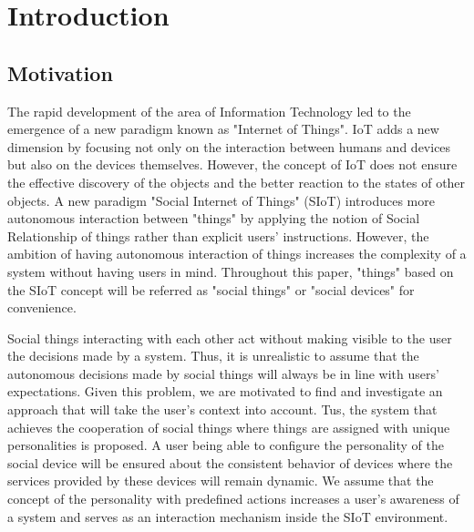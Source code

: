 \chapter{Introduction}
\label{ch:introduction}

\section{Motivation}
\label{sec:motivation}
The rapid development of the area of Information Technology led to the
emergence of a new paradigm known as "Internet of Things".
IoT adds a new dimension by focusing not only on the interaction between
humans and devices but also on the devices themselves.
However, the concept of IoT does not ensure the effective discovery of the
objects and the better reaction to the states of other objects.
A new paradigm "Social Internet of Things" (SIoT) introduces more autonomous
interaction between "things" by applying the notion of Social Relationship of
things rather than explicit users' instructions.
However, the ambition of having autonomous interaction of things increases
the complexity of a system without having users in mind.
Throughout this paper, "things" based on the SIoT concept will be referred as
"social things" or "social devices" for convenience.

Social things interacting with each other act without making visible to the
user the decisions made by a system.
Thus, it is unrealistic to assume that the autonomous decisions made by
social things will always be in line with users' expectations.
Given this problem, we are motivated to find and investigate an approach
that will take the user's context into account.
Tus, the system that achieves the cooperation of social things
where things are assigned with unique personalities is proposed.
A user being able to configure the personality of the social device will be ensured about
the consistent behavior of devices where the services provided by these devices will remain dynamic.
We assume that the concept of the personality with predefined actions increases a user's
awareness of a system and serves as an interaction mechanism inside the SIoT environment.

